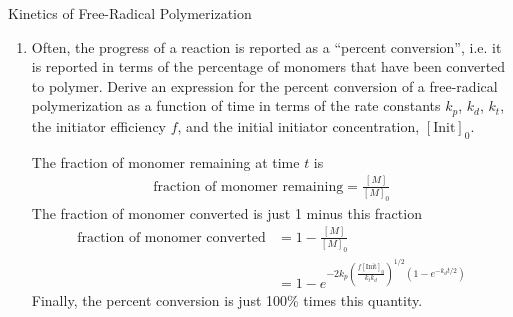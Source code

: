 \begin{activity}{Kinetics of Free-Radical Polymerization}
\begin{exercises}
\begin{enumerate}
			\item Often, the progress of a reaction is reported as a ``percent conversion'', i.e. it is reported in terms of the percentage of monomers that have been converted to polymer.  Derive an expression for the percent conversion of a free-radical polymerization as a function of time in terms of the rate constants $k_p$, $k_d$, $k_t$, the initiator efficiency $f$, and the initial initiator concentration, $[\text{Init}]_0$.
			
				\begin{solution}{}
					The fraction of monomer remaining at time $t$ is
					\begin{align*}
						\text{fraction of monomer remaining} = \frac{[M]}{[M]_0}
					\end{align*}
					The fraction of monomer converted is just 1 minus this fraction
					\begin{align*}
						\text{fraction of monomer converted} &= 1- \frac{[M]}{[M]_0}\\
						&= 1 - e^{- 2k_p\left(\frac{f[\text{Init}]_0 }{k_t k_d}\right)^{1/2} \left(1- e^{-k_d t/2} \right)}
					\end{align*}
					Finally, the percent conversion is just 100\% times this quantity.
				\end{solution}
		\end{enumerate}
		


	
\end{exercises}



%
%	


	
\end{activity}